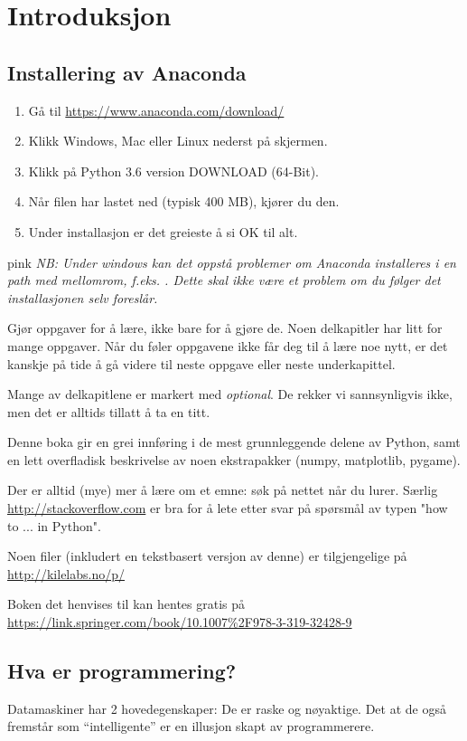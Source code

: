 \chapter{Introduksjon}
\section{Installering av Anaconda}
\begin{enumerate}[nosep]
\item Gå til \url{https://www.anaconda.com/download/}
\item Klikk Windows, Mac eller Linux nederst på skjermen.
\item Klikk på Python 3.6 version  DOWNLOAD  (64-Bit).
\item Når filen har lastet ned (typisk 400 MB), kjører du den.
\item Under installasjon er det greieste å si OK til alt.
\end{enumerate}
\begin{usncbox}{pink}
{\em NB: Under windows kan det oppstå problemer om Anaconda installeres i en path med mellomrom, f.eks. . Dette skal ikke være et problem om du følger det installasjonen selv foreslår.}
\end{usncbox}

Gjør oppgaver for å lære, ikke bare for å gjøre de. Noen delkapitler har litt for mange oppgaver. Når du føler oppgavene ikke får deg til å lære noe nytt, er det kanskje på tide å gå videre til neste oppgave eller neste underkapittel. 

Mange av delkapitlene er markert med {\em optional}. De rekker vi sannsynligvis ikke, men det er alltids tillatt å ta en titt. 

Denne boka gir en grei innføring i de mest grunnleggende delene av Python, samt en lett overfladisk beskrivelse av noen ekstrapakker (numpy, matplotlib, pygame). 

Der er alltid (mye) mer å lære om et emne: søk på nettet når du lurer. Særlig \url{http://stackoverflow.com} er bra for å lete etter svar på spørsmål av typen "how to ... in Python". 

Noen filer (inkludert en tekstbasert versjon av denne) er tilgjengelige på \url{http://kilelabs.no/p/}

Boken det henvises til kan hentes gratis på \url{https://link.springer.com/book/10.1007%2F978-3-319-32428-9}

\section{Hva er programmering?}
Datamaskiner har 2 hovedegenskaper: De er raske og nøyaktige. Det at de også fremstår som ``intelligente'' er en illusjon skapt av programmerere.


